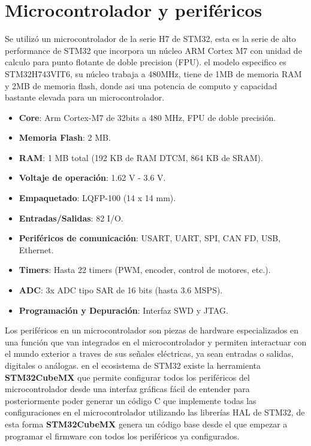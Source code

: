 \documentclass[11pt]{report}
\begin{document}
\section{Microcontrolador y periféricos}
Se utilizó un microcontrolador de la serie H7 de STM32, esta es la serie de alto performance de STM32 que incorpora un núcleo ARM Cortex M7 con unidad de calculo para punto flotante de doble precision (FPU). el modelo especifico es STM32H743VIT6, su núcleo trabaja a 480MHz, tiene de 1MB de memoria RAM y 2MB de memoria flash, donde asi una potencia de computo y capacidad bastante elevada para un microcontrolador.

\begin{itemize}
	\item \textbf{Core}: Arm Cortex-M7 de 32bits a 480 MHz, FPU de doble precisión.
	\item \textbf{Memoria Flash}: 2 MB.
	\item \textbf{RAM}: 1 MB total (192 KB de RAM DTCM, 864 KB de SRAM).
	\item \textbf{Voltaje de operación}: 1.62 V - 3.6 V.
	\item \textbf{Empaquetado}: LQFP-100 (14 x 14 mm).
	\item \textbf{Entradas/Salidas}: 82 I/O.
	\item \textbf{Periféricos de comunicación}: USART, UART, SPI, CAN FD, USB, Ethernet.
	\item \textbf{Timers}: Hasta 22 timers (PWM, encoder, control de motores, etc.).
	\item \textbf{ADC}: 3x ADC tipo SAR de 16 bits (hasta 3.6 MSPS).
	\item \textbf{Programación y Depuración}: Interfaz SWD y JTAG.
\end{itemize}

Los periféricos en un microcontrolador son piezas de hardware especializados en una función que van integrados en el microcontrolador y permiten interactuar con el mundo exterior a traves de sus señales eléctricas, ya sean entradas o salidas, digitales o análogas. en el ecosistema de STM32 existe la herramienta \textbf{STM32CubeMX} que permite configurar todos los periféricos del microcontrolador desde una interfaz gráficas fácil de entender para posteriormente poder generar un código C que implemente todas las configuraciones en el microcontrolador utilizando las librerías HAL de STM32, de esta forma \textbf{STM32CubeMX} genera un código base desde el que empezar a programar el firmware con todos los periféricos ya configurados.
\end{document}
